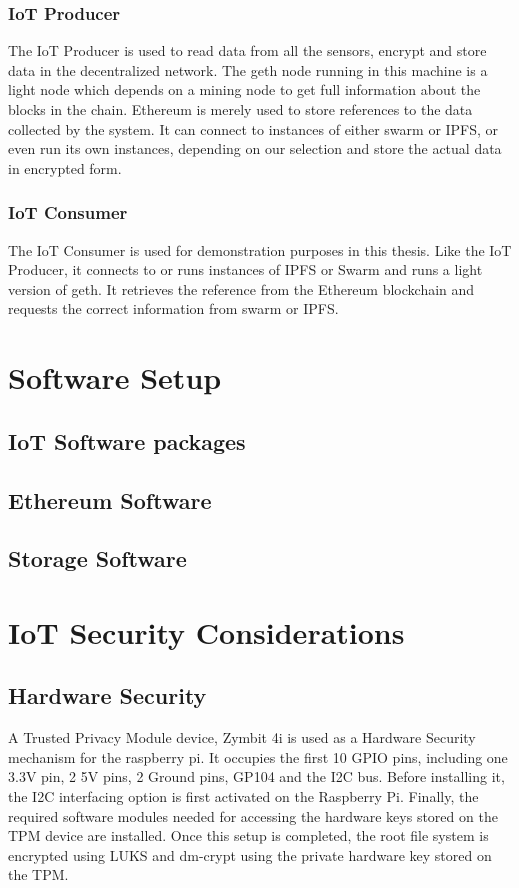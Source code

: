 \documentclass[11pt,openright]{report}
\begin{document}
\subsubsection{IoT Producer}
The IoT Producer is used to read data from all the sensors, encrypt and store data in the decentralized network. The geth node running in this machine is a light node which depends on a mining node to get full information about the blocks in the chain. Ethereum is merely used to store references to the data collected by the system. It can connect to instances of either swarm or IPFS, or even run its own instances, depending on our selection and store the actual data in encrypted form.

\subsubsection{IoT Consumer}
The IoT Consumer is used for demonstration purposes in this thesis. Like the IoT Producer, it connects to or runs instances of IPFS or Swarm and runs a light version of geth. It retrieves the reference from the Ethereum blockchain and requests the correct information from swarm or IPFS.

\section{Software Setup}
\subsection{IoT Software packages}
\subsection{Ethereum Software}
\subsection{Storage Software}

\section{IoT Security Considerations}
\subsection{Hardware Security}
A Trusted Privacy Module device, Zymbit 4i is used as a Hardware Security mechanism for the raspberry pi. It occupies the first 10 GPIO pins, including one 3.3V pin, 2 5V pins, 2 Ground pins, GP104 and the I2C bus. Before installing it, the I2C interfacing option is first activated on the Raspberry Pi. Finally, the required software modules needed for accessing the hardware keys stored on the TPM device are installed. Once this setup is completed, the root file system is encrypted using LUKS and dm-crypt using the private hardware key stored on the TPM.
\end{document}

